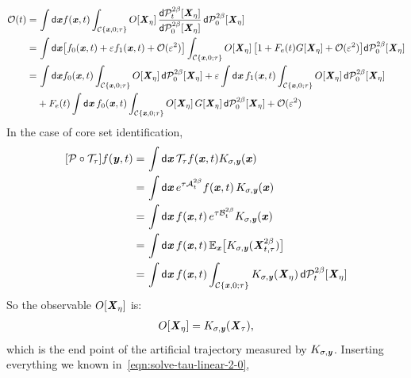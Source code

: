 \documentclass[aip,jcp,a4paper,reprint,onecolumn]{revtex4-1}
\newcommand{\vect}[1]{\textbf{\textit{#1}}}
\newcommand{\dd}{\textsf{d}}
\newcommand{\mt}{\mathcal T}
\newcommand{\mo}{\mathcal O}
\newcommand{\mc}{\mathcal C}
\newcommand{\fwg}{{\mathcal A}}
\newcommand{\bwg}{{\mathcal B}}
\begin{document}
\begin{align}\nonumber
  \mo(t)
  =&\,
  \int \dd \vect x
  f(\vect x, t)
  \int_{\mc\{\vect x,0;\tau\}}
  O[\vect X_\eta]\,
  \frac{\dd \mathcal P^{2\beta}_t[\vect X_\eta]}
  {\dd \mathcal P^{2\beta}_0[\vect X_\eta]}\,
  \dd \mathcal P^{2\beta}_0[\vect X_\eta]  \\\nonumber
  =&\,
  \int \dd \vect x
  \big[
  f_{0}(\vect x, t)
  + \varepsilon f_{1}(\vect x, t)
  + \mo(\varepsilon^2)
  \big]
  \int_{\mc\{\vect x,0;\tau\}}
  O[\vect X_\eta]\,
  \big[
  1 
  + F_e(t) G[\vect X_\eta]
  + \mo(\varepsilon^2)
  \big]
  \dd \mathcal P^{2\beta}_0[\vect X_\eta]
  \\\nonumber
  =&\,
  \int \dd \vect x
  f_{0}(\vect x, t)
  \int_{\mc\{\vect x,0;\tau\}}
  O[\vect X_\eta]\,
  \dd \mathcal P^{2\beta}_0[\vect X_\eta]
  +
  \varepsilon
  \int \dd \vect x\,
  f_{1}(\vect x, t)
  \int_{\mc\{\vect x,0;\tau\}}
  O[\vect X_\eta]\,
  \dd \mathcal P^{2\beta}_0[\vect X_\eta]\\\label{eqn:solve-tau-linear-2-0}
  &+
  F_e(t)
  \int \dd \vect x\,
  f_{0}(\vect x, t)
  \int_{\mc\{\vect x,0;\tau\}}
  O[\vect X_\eta]\,
  G[\vect X_\eta]\,
  \dd \mathcal P^{2\beta}_0[\vect X_\eta]
  + \mo(\varepsilon^2) 
\end{align}
In the case of core set identification,
\begin{align}\nonumber
  [\mathcal P\circ \mt_\tau] f(\vect y,t)
  =&\,
  \int\dd \vect x\,
  \mt_\tau f(\vect x,t) K_{\sigma,\vect y}(\vect x)\\\nonumber
  =&\,
  \int\dd \vect x\,
  e^{\tau\fwg_t^{2\beta}} f(\vect x,t) \,K_{\sigma,\vect y}(\vect x)\\\nonumber
  =&\,
  \int\dd \vect x\,
  f(\vect x,t) \,e^{\tau\bwg_t^{2\beta}}K_{\sigma,\vect y}(\vect x)  \\\nonumber
  =&\,
  \int\dd \vect x\,
  f(\vect x,t) \,\mathbb E_{\vect x}
  \big[
  K_{\sigma,\vect y}(\vect X^{2\beta}_{t,\tau})
  \big]  
  \\
  =&\,
  \int\dd \vect x\,
  f(\vect x,t) 
  \int_{\mc\{\vect x,0;\tau\}} K_{\sigma,\vect y}(\vect X_\eta)\,
  \dd\mathcal P^{2\beta}_t[\vect X_\eta]
\end{align}
So the observable $O[\vect X_\eta]$
is:
\begin{align}
  O[\vect X_\eta] = 
  K_{\sigma,\vect y}(\vect X_\tau),
\end{align}
which is the end point of the artificial
trajectory measured by $K_{\sigma,\vect y}$.
Inserting everything we known in~\eqref{eqn:solve-tau-linear-2-0},
\end{document}
